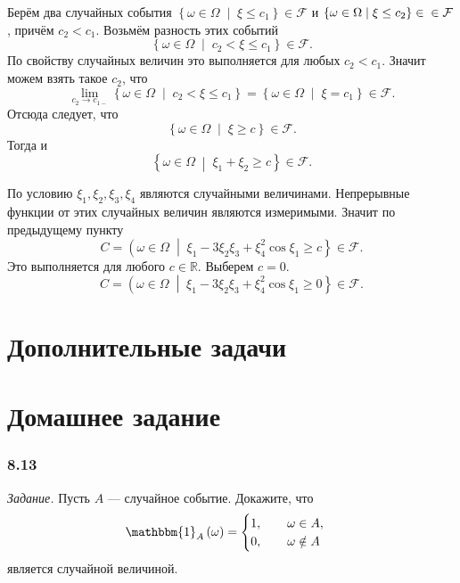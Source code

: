 Берём два случайных события $ \left\{ \omega \in \Omega \; \middle| \; \xi \leq c_1 \right\} \in \mathcal{F} $ и
$ \left\{ \omega \in \Omega \; \middle| \; \xi \leq c_2 \right\} \in \\
\in \mathcal{F} $, причём $c_2 < c_1$.
Возьмём разность этих событий
$$ \left\{ \omega \in \Omega \; \middle| \; c_2 < \xi \leq c_1 \right\} \in \mathcal{F}.$$
По свойству случайных величин это выполняется для любых $c_2 < c_1$.
Значит можем взять такое $c_2$, что
$$ \lim \limits_{c_2 \to c_{1-}} \left\{ \omega \in \Omega \; \middle| \; c_2 < \xi \leq c_1 \right\} =
\left\{ \omega \in \Omega \; \middle| \; \xi = c_1 \right\} \in \mathcal{F}.$$
Отсюда следует, что
$$ \left\{ \omega \in \Omega \; \middle| \; \xi \geq c \right\} \in \mathcal{F}.$$
Тогда и
$$ \left\{ \omega \in \Omega \; \middle| \; \xi_1 + \xi_2 \geq c \right\} \in \mathcal{F}.$$

По условию $ \xi_1, \xi_2, \xi_3, \xi_4$ являются случайными величинами.
Непрерывные функции от этих случайных величин являются измеримыми.
Значит по предыдущему пункту
$$C =
\left( \omega \in \Omega \; \middle| \; \xi_1 -3 \xi_2 \xi_3 + \xi_4^2 \cos \xi_1 \geq c \right\} \in
\mathcal{F}.$$
Это выполняется для любого $c \in \mathbb{R}$.
Выберем $c = 0$.
$$C =
\left( \omega \in \Omega \; \middle| \; \xi_1 -3 \xi_2 \xi_3 + \xi_4^2 \cos \xi_1 \geq 0 \right\} \in
\mathcal{F}.$$

\section*{Дополнительные задачи}

\section*{Домашнее задание}

\subsubsection*{8.13}

\textit{Задание.} Пусть $A$ --- случайное событие.
Докажите, что
$$ \mathbbm{1}_A \left( \omega \right) =
\begin{cases}
1, \qquad \omega \in A, \\
0, \qquad \omega \notin A
\end{cases}$$
является случайной величиной.

